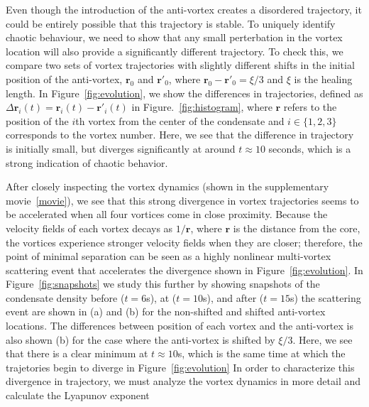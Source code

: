 Even though the introduction of the anti-vortex creates a disordered trajectory, it could be entirely possible that this trajectory is stable.
To uniquely identify chaotic behaviour, we need to show that any small perterbation in the vortex location will also provide a significantly different trajectory.
To check this, we compare two sets of vortex trajectories with slightly different shifts in the initial position of the anti-vortex, $\mathbf{r}_0$ and $\mathbf{r}'_0$, where $\mathbf{r}_0 - \mathbf{r}'_0 = \xi/3$ and $\xi$ is the healing length.
In Figure~\ref{fig:evolution}, we show the differences in trajectories, defined as $\Delta \mathbf{r}_i(t) = \mathbf{r}_{i}(t)-\mathbf{r}'_{i}(t)$ in Figure.~\ref{fig:histogram}, where $\mathbf{r}$ refers to the position of the $i$th vortex from the center of the condensate and $i\in \{1,2,3\}$ corresponds to the vortex number.
Here, we see that the difference in trajectory is initially small, but diverges significantly at around $t \approx 10$ seconds, which is a strong indication of chaotic behavior.

After closely inspecting the vortex dynamics (shown in the supplementary movie~\ref{movie}), we see that this strong divergence in vortex trajectories seems to be accelerated when all four vortices come in close proximity.
Because the velocity fields of each vortex decays as $1/\mathbf{r}$, where $\mathbf{r}$ is the distance from the core, the vortices experience stronger velocity fields when they are closer; therefore, the point of minimal separation can be seen as a highly nonlinear multi-vortex scattering event that accelerates the divergence shown in Figure~\ref{fig:evolution}.
In Figure~\ref{fig:snapshots} we study this further by showing snapshots of the condensate density before ($t = 6$s), at ($t = 10$s), and after ($t = 15$s) the scattering event are shown in (a) and (b) for the non-shifted and shifted anti-vortex locations.
The differences between position of each vortex and the anti-vortex is also shown (b) for the case where the anti-vortex is shifted by $\xi/3$.
Here, we see that there is a clear minimum at $t \approx 10$s, which is the same time at which the  trajetories begin to diverge in Figure~\ref{fig:evolution}
In order to characterize this divergence in trajectory, we must analyze the vortex dynamics in more detail and calculate the Lyapunov exponent

